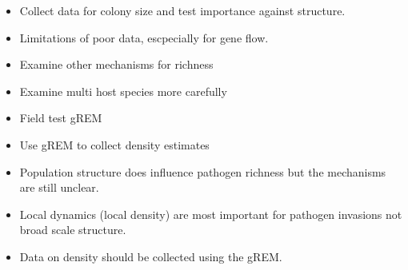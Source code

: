 
\begin{itemize}
\item Collect data for colony size and test importance against structure.
\item Limitations of poor data, escpecially for gene flow.
\item Examine other mechanisms for richness
\item Examine multi host species more carefully
\item Field test gREM
\item Use gREM to collect density estimates 
\end{itemize}



\begin{itemize}
\item Population structure does influence pathogen richness but the mechanisms are still unclear.
\item Local dynamics (local density) are most important for pathogen invasions not broad scale structure.
\item Data on density should be collected using the gREM.
\end{itemize}





